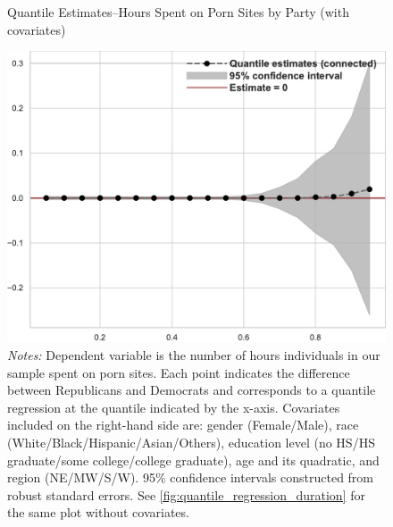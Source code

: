 \documentclass[12pt, letterpaper]{article}
\begin{document}
\begin{figure}[ht]
	\centering
	\caption{Quantile Estimates--Hours Spent on Porn Sites by Party (with covariates)}
	\includegraphics[width=.55\linewidth]{../figs/quantile_reg_covariates_duration_adult.pdf}
	\caption*{\footnotesize \emph{Notes:} 
		Dependent variable is the number of hours individuals in our sample spent on porn sites.
		Each point indicates the difference between Republicans and Democrats and corresponds to a quantile regression at the quantile indicated by the x-axis.
		Covariates included on the right-hand side are: gender (Female/Male), race (White/Black/Hispanic/Asian/Others), education level (no HS/HS graduate/some college/college graduate), age and its quadratic, and region (NE/MW/S/W).
		95\% confidence intervals constructed from robust standard errors.
		See \cref{fig:quantile_regression_duration} for the same plot without covariates.
	}
	\label{fig:quantile_regression_duration_covariates}
\end{figure}
\end{document}
